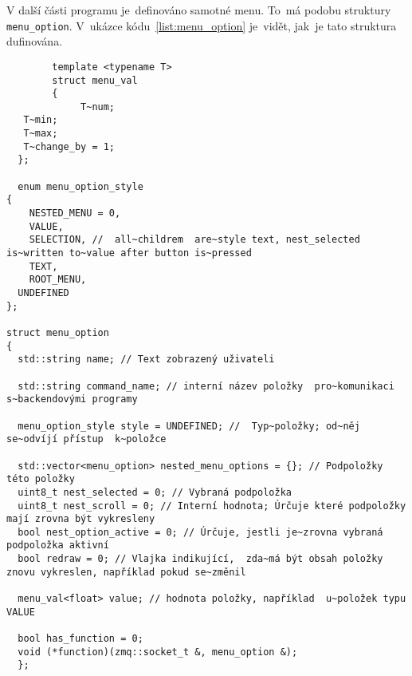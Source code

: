 V další části programu je~definováno samotné menu. To~má podobu struktury \texttt{menu_option}.  V~ukázce kódu~\ref{list:menu_option}  je~vidět,  jak~je tato struktura dufinována.
\begin{code}
    \begin{verbatim}
        template <typename T>
        struct menu_val
        {
             T~num;
   T~min;
   T~max;
   T~change_by = 1;
  };
  
  enum menu_option_style
{
    NESTED_MENU = 0,
    VALUE,
    SELECTION, //  all~childrem  are~style text, nest_selected is~written to~value after button is~pressed
    TEXT,
    ROOT_MENU,
  UNDEFINED
};

struct menu_option
{
  std::string name; // Text zobrazený uživateli

  std::string command_name; // interní název položky  pro~komunikaci  s~backendovými programy

  menu_option_style style = UNDEFINED; //  Typ~položky; od~něj se~odvíjí přístup  k~položce

  std::vector<menu_option> nested_menu_options = {}; // Podpoložky této položky
  uint8_t nest_selected = 0; // Vybraná podpoložka
  uint8_t nest_scroll = 0; // Interní hodnota; Úrčuje které podpoložky mají zrovna být vykresleny
  bool nest_option_active = 0; // Úrčuje, jestli je~zrovna vybraná podpoložka aktivní
  bool redraw = 0; // Vlajka indikující,  zda~má být obsah položky znovu vykreslen, například pokud se~změnil

  menu_val<float> value; // hodnota položky, například  u~položek typu VALUE

  bool has_function = 0;
  void (*function)(zmq::socket_t &, menu_option &);
  };
\end{verbatim}
\end{code}

